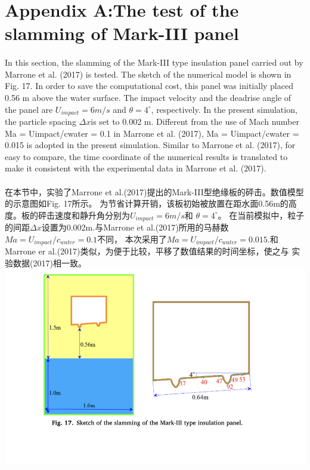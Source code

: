\documentclass[UTF8]{ctexart}
\begin{document}
\section{Appendix A:The test of the slamming of Mark-III panel}
\paragraph{\quad}In this section, the slamming of the Mark-III type insulation panel carried 
                out by Marrone et al. (2017) is tested. The sketch of the numerical model is shown in Fig. 17. 
                In order to save the computational cost, this panel was initially placed 0.56 m above the water 
                surface. The impact velocity and the deadrise angle of the panel are $U_{impact} = 6m/s$ and $\theta = 4^\circ$,
                respectively. In the present simulation, the particle spacing $\Delta x $is set to 0.002 m. Different from 
                the use of Mach number Ma = Uimpact/cwater = 0.1 in Marrone et al. (2017), Ma = Uimpact/cwater = 0.015 
                is adopted in the present simulation. Similar to Marrone et al. (2017), for easy to compare, the time 
                coordinate of the numerical results is translated to make it consistent with the experimental data in 
                Marrone et al. (2017).
\paragraph{\quad}在本节中，实验了Marrone et al.(2017)提出的Mark-III型绝缘板的砰击。数值模型的示意图如Fig. 17所示。
                为节省计算开销，该板初始被放置在距水面0.56m的高度。板的砰击速度和静升角分别为$U_{impact} = 6m/s$和 $\theta = 4^\circ$。
                在当前模拟中，粒子的间距$\Delta x$设置为0.002m.与Marrone et al.(2017)所用的马赫数$Ma=U_{impact}/c_{water}=0.1$不同，
                本次采用了$Ma=U_{impact}/c_{water}=0.015$.和Marrone er al.(2017)类似，为便于比较，平移了数值结果的时间坐标，使之与
                实验数据(2017)相一致。
{
    \centering
    \includegraphics{./source/Fig17.png}
}
\end{document}
